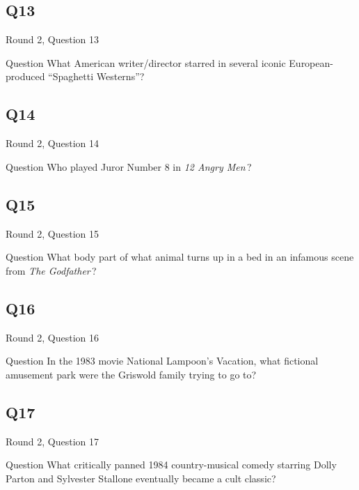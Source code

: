 \documentclass[11pt]{beamer}
\begin{document}
\subsection*{Q13}
\begin{frame}[t]{Round 2, Question 13}
\vspace{2em}
\begin{block}{Question}
What American writer/director starred in several iconic European-produced ``Spaghetti Westerns''?
\end{block}
\end{frame}
    

\subsection*{Q14}
\begin{frame}[t]{Round 2, Question 14}
\vspace{2em}
\begin{block}{Question}
Who played Juror Number 8 in \emph{12 Angry Men}\,?
\end{block}
\end{frame}
    

\subsection*{Q15}
\begin{frame}[t]{Round 2, Question 15}
\vspace{2em}
\begin{block}{Question}
What body part of what animal turns up in a bed in an infamous scene from \emph{The Godfather}\,?
\end{block}
\end{frame}
    

\subsection*{Q16}
\begin{frame}[t]{Round 2, Question 16}
\vspace{2em}
\begin{block}{Question}
In the 1983 movie National Lampoon's Vacation, what fictional amusement park were the Griswold family trying to go to?
\end{block}
\end{frame}
    

\subsection*{Q17}
\begin{frame}[t]{Round 2, Question 17}
\vspace{2em}
\begin{block}{Question}
What critically panned 1984 country-musical comedy starring Dolly Parton and Sylvester Stallone eventually became a cult classic?
\end{block}
\end{frame}
    
\end{document}
